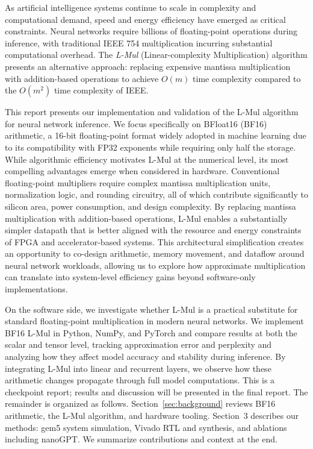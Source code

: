 \documentclass[12pt,letterpaper]{article}
\begin{document}
As artificial intelligence systems continue to scale in complexity and computational demand, speed and energy efficiency have emerged as critical constraints. Neural networks require billions of floating-point operations during inference, with traditional IEEE 754 multiplication incurring substantial computational overhead. The \textit{L-Mul} (Linear-complexity Multiplication) algorithm presents an alternative approach: replacing expensive mantissa multiplication with addition-based operations to achieve $O(m)$ time complexity compared to the $O(m^2)$ time complexity of IEEE.

This report presents our implementation and validation of the L-Mul algorithm for neural network inference. We focus specifically on BFloat16 (BF16) arithmetic, a 16-bit floating-point format widely adopted in machine learning due to its compatibility with FP32 exponents while requiring only half the storage. While algorithmic efficiency motivates L-Mul at the numerical level, its most compelling advantages emerge when considered in hardware. Conventional floating-point multipliers require complex mantissa multiplication units, normalization logic, and rounding circuitry, all of which contribute significantly to silicon area, power consumption, and design complexity. By replacing mantissa multiplication with addition-based operations, L-Mul enables a substantially simpler datapath that is better aligned with the resource and energy constraints of FPGA and accelerator-based systems. This architectural simplification creates an opportunity to co-design arithmetic, memory movement, and dataflow around neural network workloads, allowing us to explore how approximate multiplication can translate into system-level efficiency gains beyond software-only implementations.

On the software side, we investigate whether L-Mul is a practical substitute for standard floating-point multiplication in modern neural networks. We implement BF16 L-Mul in Python, NumPy, and PyTorch and compare results at both the scalar and tensor level, tracking approximation error and perplexity and analyzing how they affect model accuracy and stability during inference. By integrating L-Mul into linear and recurrent layers, we observe how these arithmetic changes propagate through full model computations. This is a checkpoint report; results and discussion will be presented in the final report. The remainder is organized as follows. Section~\ref{sec:background} reviews BF16 arithmetic, the L-Mul algorithm, and hardware tooling. Section~3 describes our methods: gem5 system simulation, Vivado RTL and synthesis, and ablations including nanoGPT. We summarize contributions and context at the end.
\end{document}
